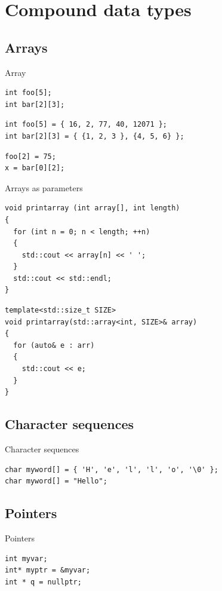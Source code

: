 \documentclass{beamer}
\begin{document}
\section{Compound data types}
\subsection{Arrays}
\begin{frame}[fragile]{Array}
\begin{lstlisting}[caption=Array declaration]
int foo[5];
int bar[2][3];
\end{lstlisting}

\begin{lstlisting}[caption=Array initalisation]
int foo[5] = { 16, 2, 77, 40, 12071 };
int bar[2][3] = { {1, 2, 3 }, {4, 5, 6} };
\end{lstlisting}

\begin{lstlisting}[caption=Array access]
foo[2] = 75;
x = bar[0][2];
\end{lstlisting}
\end{frame}

\begin{frame}[fragile]{Arrays as parameters}
\begin{lstlisting}[caption=array as pointer]
void printarray (int array[], int length)
{
  for (int n = 0; n < length; ++n)
  {
    std::cout << array[n] << ' ';
  }
  std::cout << std::endl;
}
\end{lstlisting}

\begin{lstlisting}[caption=array as object]
template<std::size_t SIZE>
void printarray(std::array<int, SIZE>& array)
{
  for (auto& e : arr)
  {
    std::cout << e;
  }
}\end{lstlisting}
\end{frame}

\subsection{Character sequences}
\begin{frame}[fragile]{Character sequences}
\begin{lstlisting}[caption=Character sequences]
char myword[] = { 'H', 'e', 'l', 'l', 'o', '\0' };
char myword[] = "Hello";
\end{lstlisting}
\end{frame}

\subsection{Pointers}
\begin{frame}[fragile]{Pointers}
\begin{lstlisting}
int myvar;
int* myptr = &myvar;
int * q = nullptr;
\end{lstlisting}
\end{frame}
\end{document}
